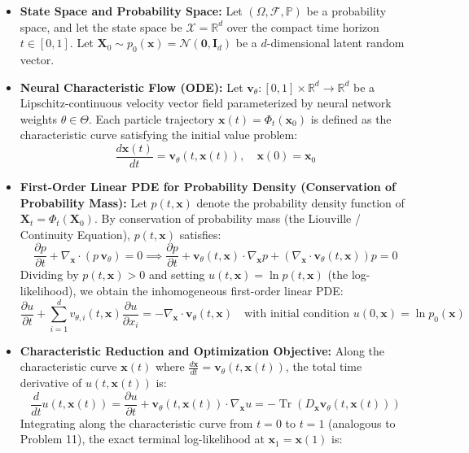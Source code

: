 \documentclass[11pt]{article}
\begin{document}
\begin{itemize}
    \item \textbf{State Space and Probability Space:} Let $(\Omega, \mathcal{F}, \mathbb{P})$ be a probability space, and let the state space be $\mathcal{X} = \mathbb{R}^d$ over the compact time horizon $t \in [0, 1]$. Let $\mathbf{X}_0 \sim p_0(\mathbf{x}) = \mathcal{N}(\mathbf{0}, \mathbf{I}_d)$ be a $d$-dimensional latent random vector.
    \item \textbf{Neural Characteristic Flow (ODE):} Let $\mathbf{v}_\theta : [0, 1] \times \mathbb{R}^d \to \mathbb{R}^d$ be a Lipschitz-continuous velocity vector field parameterized by neural network weights $\theta \in \Theta$. Each particle trajectory $\mathbf{x}(t) = \Phi_t(\mathbf{x}_0)$ is defined as the characteristic curve satisfying the initial value problem:
    \[
    \frac{d\mathbf{x}(t)}{dt} = \mathbf{v}_\theta(t, \mathbf{x}(t)), \quad \mathbf{x}(0) = \mathbf{x}_0
    \]
    \item \textbf{First-Order Linear PDE for Probability Density (Conservation of Probability Mass):} Let $p(t, \mathbf{x})$ denote the probability density function of $\mathbf{X}_t = \Phi_t(\mathbf{X}_0)$. By conservation of probability mass (the Liouville / Continuity Equation), $p(t, \mathbf{x})$ satisfies:
    \[
    \frac{\partial p}{\partial t} + \nabla_{\mathbf{x}} \cdot (p\,\mathbf{v}_\theta) = 0 \implies \frac{\partial p}{\partial t} + \mathbf{v}_\theta(t, \mathbf{x}) \cdot \nabla_{\mathbf{x}} p + \left(\nabla_{\mathbf{x}} \cdot \mathbf{v}_\theta(t, \mathbf{x})\right)p = 0
    \]
    Dividing by $p(t, \mathbf{x}) > 0$ and setting $u(t, \mathbf{x}) = \ln p(t, \mathbf{x})$ (the log-likelihood), we obtain the inhomogeneous first-order linear PDE:
    \[
    \frac{\partial u}{\partial t} + \sum_{i=1}^d v_{\theta, i}(t, \mathbf{x})\frac{\partial u}{\partial x_i} = -\nabla_{\mathbf{x}} \cdot \mathbf{v}_\theta(t, \mathbf{x}) \quad \text{with initial condition } u(0, \mathbf{x}) = \ln p_0(\mathbf{x})
    \]
    \item \textbf{Characteristic Reduction and Optimization Objective:} Along the characteristic curve $\mathbf{x}(t)$ where $\frac{d\mathbf{x}}{dt} = \mathbf{v}_\theta(t, \mathbf{x}(t))$, the total time derivative of $u(t, \mathbf{x}(t))$ is:
    \[
    \frac{d}{dt}u(t, \mathbf{x}(t)) = \frac{\partial u}{\partial t} + \mathbf{v}_\theta(t, \mathbf{x}(t)) \cdot \nabla_{\mathbf{x}} u = -\operatorname{Tr}\left(D_{\mathbf{x}}\mathbf{v}_\theta(t, \mathbf{x}(t))\right)
    \]
    Integrating along the characteristic curve from $t = 0$ to $t = 1$ (analogous to Problem 11), the exact terminal log-likelihood at $\mathbf{x}_1 = \mathbf{x}(1)$ is:

\end{itemize}
\end{document}
